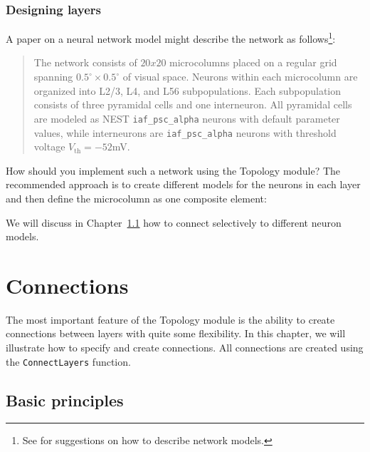 \documentclass[a4paper,12pt]{report}
\begin{document}
\subsection{Designing layers}\label{sec:layerdesign}

A paper on a neural network model might describe the network as
follows\footnote{See \citet{Nord:2009(456)} for suggestions on how to
  describe network models.}:
\begin{quote}
The network consists of $20x20$ microcolumns placed on a regular grid
spanning $0.5^\circ\times 0.5^\circ$ of visual space. Neurons within each
microcolumn are organized into L2/3, L4, and L56
subpopulations. Each subpopulation consists of three pyramidal cells
and one interneuron. All pyramidal cells are modeled as NEST
\lstinline!iaf_psc_alpha! neurons with default parameter values, while
interneurons are \lstinline!iaf_psc_alpha! neurons with threshold voltage
$V_{\text{th}}=-52$mV.
\end{quote}
How should you implement such a network using the Topology module?
The recommended approach is to create different models for the
neurons in each layer and then define the microcolumn as one
composite element:
%

%
We will discuss in Chapter~\ref{sec:conn_basics} how to connect
selectively to different neuron models.


\chapter{Connections}\label{sec:connections}

The most important feature of the Topology module is the ability to
create connections between layers with quite some
flexibility. In this chapter, we will illustrate how to specify and
create connections. All connections are created using the
\lstinline!ConnectLayers! function.


\section{Basic principles}\label{sec:conn_basics}
\end{document}
